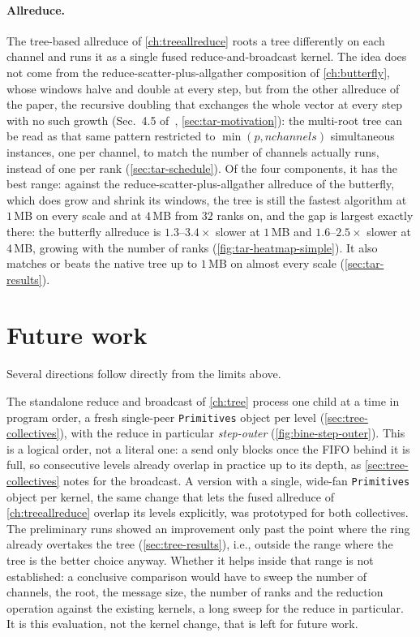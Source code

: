 \paragraph{Allreduce.}
The tree-based allreduce of \cref{ch:treeallreduce} roots a \bine{} tree differently on each channel and runs it as a single fused reduce-and-broadcast kernel.
The idea does not come from the reduce-scatter-plus-allgather composition of \cref{ch:butterfly}, whose windows halve and double at every step, but from the other allreduce of the \bine{} paper, the recursive doubling that exchanges the whole vector at every step with no such growth (Sec.~4.5 of~\cite{desensi2025bine}, \cref{sec:tar-motivation}): the multi-root tree can be read as that same pattern restricted to $\min(p,\mathit{nchannels})$ simultaneous instances, one per channel, to match the number of channels \nccl{} actually runs, instead of one per rank (\cref{sec:tar-schedule}).
Of the four components, it has the best range: against the reduce-scatter-plus-allgather allreduce of the \bine{} butterfly, which does grow and shrink its windows, the tree is still the fastest algorithm at $1$\,MB on every scale and at $4$\,MB from $32$ ranks on, and the gap is largest exactly there: the butterfly allreduce is $1.3$--$3.4\times$ slower at $1$\,MB and $1.6$--$2.5\times$ slower at $4$\,MB, growing with the number of ranks (\cref{fig:tar-heatmap-simple}).
It also matches or beats the native \nccl{} tree up to $1$\,MB on almost every scale (\cref{sec:tar-results}).

\section{Future work}
Several directions follow directly from the limits above.

The standalone reduce and broadcast of \cref{ch:tree} process one child at a time in program order, a fresh single-peer \texttt{Primitives} object per level (\cref{sec:tree-collectives}), with the reduce in particular \emph{step-outer} (\cref{fig:bine-step-outer}).
This is a logical order, not a literal one: a send only blocks once the FIFO behind it is full, so consecutive levels already overlap in practice up to its depth, as \cref{sec:tree-collectives} notes for the broadcast.
A version with a single, wide-fan \texttt{Primitives} object per kernel, the same change that lets the fused allreduce of \cref{ch:treeallreduce} overlap its levels explicitly, was prototyped for both collectives. The preliminary runs showed an improvement only past the point where the ring already overtakes the tree (\cref{sec:tree-results}), i.e., outside the range where the tree is the better choice anyway.
Whether it helps inside that range is not established: a conclusive comparison would have to sweep the number of channels, the root, the message size, the number of ranks and the reduction operation against the existing kernels, a long sweep for the reduce in particular.
It is this evaluation, not the kernel change, that is left for future work.

